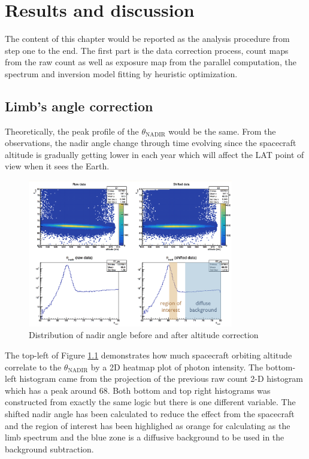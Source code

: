 \chapter{Results and discussion}

The content of this chapter would be reported as the analysis 
procedure from step one to the end. The first part is the data 
correction process, count maps from the raw count as well as 
exposure map from the parallel computation, the spectrum and 
inversion model fitting by heuristic optimization.

\section{Limb's angle correction}
Theoretically, the peak profile of the $\theta_\text{NADIR}$ would be
the same. From the observations, the nadir angle change through time 
evolving since the spacecraft altitude is gradually getting lower
in each year which will affect the LAT point of view when it sees 
the Earth.

\begin{figure}[h!]
    \centering
    \includegraphics[width=0.8\textwidth]{content/result_and_discussion/figures/LATShifted.png}
    \caption{Distribution of nadir angle before and after altitude correction}
    \label{fig:lat_nadir_shifted}
\end{figure}


The top-left of Figure \ref{fig:lat_nadir_shifted} demonstrates how 
much spacecraft orbiting altitude correlate to the $\theta_\text{NADIR}$
by a 2D heatmap plot of photon intensity. The bottom-left histogram
came from the projection of the previous raw count 2-D histogram which 
has a peak around 68\textdegree. Both bottom and top right histograms
was constructed from exactly the same logic but there is one different 
variable. The shifted nadir angle has been calculated to reduce the 
effect from the spacecraft and the region of interest has been highlighed 
as orange for calculating as the limb spectrum and the blue zone is 
a diffusive background to be used in the background subtraction.

